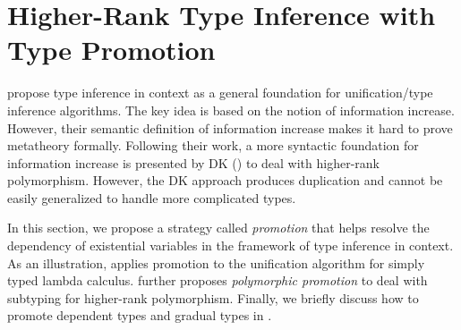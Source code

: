 \chapter{Higher-Rank Type Inference with Type Promotion}
\label{chap:Promotion}

\cite{gundry2010type} propose type inference in context as a general foundation
for unification/type inference algorithms. The key idea is based on the notion
of information increase. However, their semantic definition of information
increase makes it hard to prove metatheory formally. Following their work, a
more syntactic foundation for information increase is presented by DK
(\cite{DK}) to deal with higher-rank polymorphism. However, the DK approach
produces duplication and cannot be easily generalized to handle more complicated
types.

In this section, we propose a strategy called \textit{promotion} that helps
resolve the dependency of existential variables in the framework of type
inference in context. As an illustration,  applies promotion
to the unification algorithm for simply typed lambda calculus.
 further proposes \textit{polymorphic promotion} to deal
with subtyping for higher-rank polymorphism. Finally, we briefly discuss how to promote
dependent types and gradual types in .







